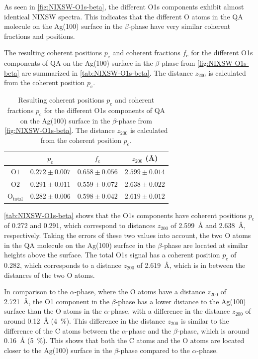 As seen in \autoref{fig:NIXSW-O1s-beta}, the different O1s components exhibit almost identical \ac{NIXSW} spectra. This indicates that the different O atoms in the \ac{QA} molecule on the Ag(100) surface in the $\beta$-phase have very similar coherent fractions and positions.

The resulting coherent positions $p_\mathrm{c}$ and coherent fractions $f_\mathrm{c}$ for the different O1s components of \ac{QA} on the Ag(100) surface in the $\beta$-phase from \autoref{fig:NIXSW-O1s-beta} are summarized in \autoref{tab:NIXSW-O1s-beta}. The distance $z_{200}$ is calculated from the coherent position $p_\mathrm{c}$.

\begin{table}[htbp]
	\centering
	\caption{Resulting coherent positions $p_\mathrm{c}$ and coherent fractions $p_\mathrm{c}$ for the different O1s components of \ac{QA} on the Ag(100) surface in the $\beta$-phase from \autoref{fig:NIXSW-O1s-beta}. The distance $z_{200}$ is calculated from the coherent position $p_\mathrm{c}$.}
	\begin{tabular}{@{}cccc@{}} \toprule
		 & $p_\mathrm{c}$ & $f_\mathrm{c}$ & $z_{200}$ (\si{\angstrom}) \\
		\midrule
		$\mathrm{O1}$ & $0.272 \pm 0.007$ & $0.658 \pm 0.056$ & $2.599 \pm 0.014$ \\
		$\mathrm{O2}$ & $0.291 \pm 0.011$ & $0.559 \pm 0.072$ & $2.638 \pm 0.022$ \\ 
        $\mathrm{O_{total}}$ & $0.282 \pm 0.006$ & $0.598 \pm 0.042$ & $2.619 \pm 0.012$ \\
		\bottomrule
	\end{tabular}
	\label{tab:NIXSW-O1s-beta}
\end{table}

\autoref{tab:NIXSW-O1s-beta} shows that the O1s components have coherent positions $p_\mathrm{c}$ of 0.272 and 0.291, which correspond to distances $z_{200}$ of 2.599~\si{\angstrom} and 2.638~\si{\angstrom}, respectively. Taking the errors of these two values into account, the two O atoms in the \ac{QA} molecule on the Ag(100) surface in the $\beta$-phase are located at similar heights above the surface. The total O1s signal has a coherent position $p_\mathrm{c}$ of 0.282, which corresponds to a distance $z_{200}$ of 2.619~\si{\angstrom}, which is in between the distances of the two O atoms.

In comparison to the $\alpha$-phase, where the O atoms have a distance $z_{200}$ of 2.721~\si{\angstrom}, the O1 component in the $\beta$-phase has a lower distance to the Ag(100) surface than the O atoms in the $\alpha$-phase, with a difference in the distance $z_{200}$ of around 0.12~\si{\angstrom} (4~\%). This difference in the distance $z_{200}$ is similar to the difference of the C atoms between the $\alpha$-phase and the $\beta$-phase, which is around 0.16~\si{\angstrom} (5~\%). This shows that both the C atoms and the O atoms are located closer to the Ag(100) surface in the $\beta$-phase compared to the $\alpha$-phase.

